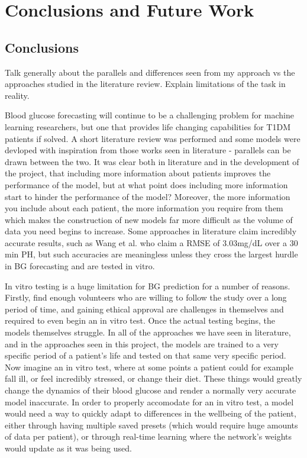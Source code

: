\section{Conclusions and Future Work} %
    \subsection{Conclusions}
        Talk generally about the parallels and differences seen from my approach vs the approaches studied in the literature review. Explain limitations of the task in reality.

        Blood glucose forecasting will continue to be a challenging problem for machine learning researchers, but one that provides life changing capabilities for T1DM patients if solved. A short literature review was performed and some models were devloped with inspiration from those works seen in literature - parallels can be drawn between the two. It was clear both in literature and in the development of the project, that including more information about patients improves the performance of the model, but at what point does including more information start to hinder the performance of the model? Moreover, the more information you include about each patient, the more information you require from them which makes the construction of new models far more difficult as the volume of data you need begins to increase. Some approaches in literature claim incredibly accurate results, such as Wang et al. \cite{paper8} who claim a RMSE of $3.03$mg/dL over a 30 min PH, but such accuracies are meaningless unless they cross the largest hurdle in BG forecasting and are tested in vitro.

        In vitro testing is a huge limitation for BG prediction for a number of reasons. Firstly, find enough volunteers who are willing to follow the study over a long period of time, and gaining ethical approval are challenges in themselves and required to even begin an in vitro test. Once the actual testing begins, the models themselves struggle. In all of the approaches we have seen in literature, and in the approaches seen in this project, the models are trained to a very specific period of a patient's life and tested on that same very specific period. Now imagine an in vitro test, where at some points a patient could for example fall ill, or feel incredibly stressed, or change their diet. These things would greatly change the dynamics of their blood glucose and render a normally very accurate model inaccurate. In order to properly accomodate for an in vitro test, a model would need a way to quickly adapt to differences in the wellbeing of the patient, either through having multiple saved presets (which would require huge amounts of data per patient), or through real-time learning where the network's weights would update as it was being used.

